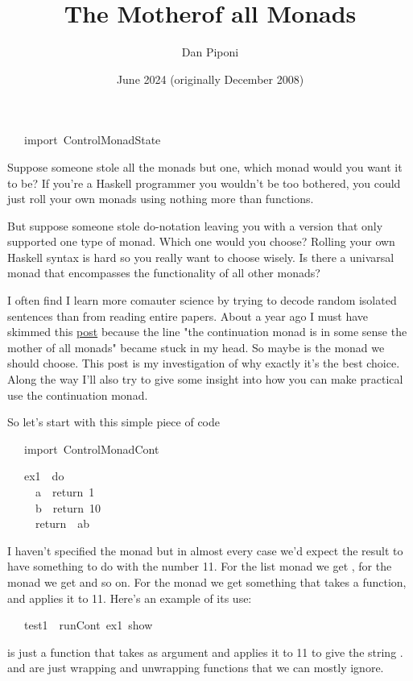 \documentclass[12pt]{article}
\title{The Motherof all Monads}
\author{Dan Piponi}
\date{June 2024 (originally December 2008)}
\begin{document}
\maketitle
\begin{tabbing}\ttfamily
~~~import~ControlMonadState
\end{tabbing}
Suppose someone stole all the monads but one, which monad would you want it to be? If you're a Haskell programmer you wouldn't be too bothered, you could just roll your own monads using nothing more than functions.

But suppose someone stole do-notation leaving you with a version that only supported one type of monad. Which one would you choose? Rolling your own Haskell syntax is hard so you really want to choose wisely. Is there a univarsal monad that encompasses the functionality of all other monads?

I often find I learn more comauter science by trying to decode random isolated sentences than from reading entire papers. About a year ago I must have skimmed this \href{http://sneezy.cs.nott.ac.uk/fplunch/weblog/?m=200712}{post} because the line "the continuation monad is in some sense the mother of all monads" became stuck in my head. So maybe  is the monad we should choose. This post is my investigation of why exactly it's the best choice. Along the way I'll also try to give some insight into how you can make practical use the continuation monad.

So let's start with this simple piece of code
\begin{tabbing}\ttfamily
~~~import~ControlMonadCont
\end{tabbing}
\begin{tabbing}\ttfamily
~~~ex1~~do\\
\ttfamily ~~~~~a~~return~1\\
\ttfamily ~~~~~b~~return~10\\
\ttfamily ~~~~~return~~ab
\end{tabbing}
I haven't specified the monad but in almost every case we'd expect the result to have something to do with the number 11. For the list monad we get , for the  monad we get  and so on. For the  monad we get something that takes a function, and applies it to 11. Here's an example of its use:
\begin{tabbing}\ttfamily
~~~test1~~runCont~ex1~show
\end{tabbing}
 is just a function that takes as argument  and applies it to 11 to give the string .  and  are just wrapping and unwrapping functions that we can mostly ignore.
\end{document}
